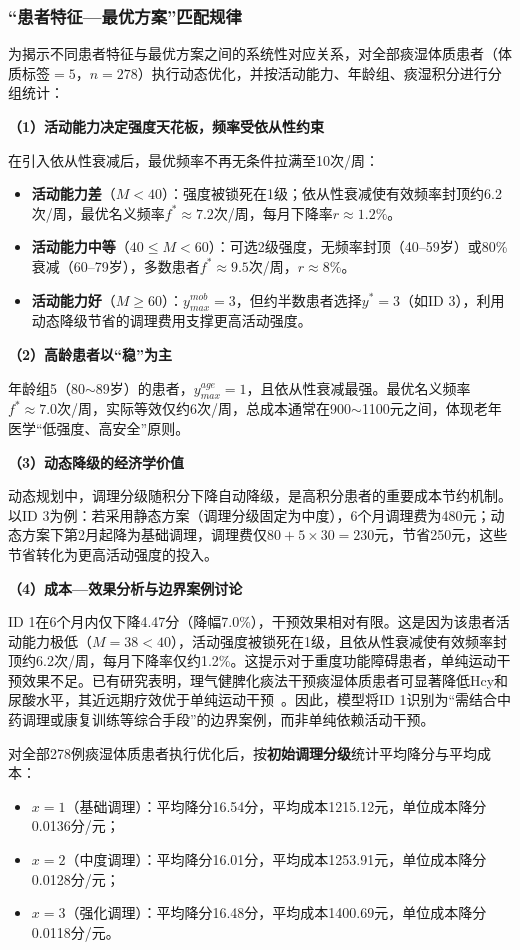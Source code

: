 \documentclass[a4paper,12pt]{ctexart}
\begin{document}
\subsubsection{``患者特征—最优方案''匹配规律}
为揭示不同患者特征与最优方案之间的系统性对应关系，对全部痰湿体质患者（体质标签$=5$，$n=278$）执行动态优化，并按活动能力、年龄组、痰湿积分进行分组统计：

\textbf{（1）活动能力决定强度天花板，频率受依从性约束}

在引入依从性衰减后，最优频率不再无条件拉满至10次/周：
\begin{itemize}
    \item \textbf{活动能力差}（$M<40$）：强度被锁死在1级；依从性衰减使有效频率封顶约6.2次/周，最优名义频率$f^*\approx7.2$次/周，每月下降率$r\approx1.2\%$。
    \item \textbf{活动能力中等}（$40\leq M<60$）：可选2级强度，无频率封顶（40--59岁）或80\%衰减（60--79岁），多数患者$f^*\approx9.5$次/周，$r\approx8\%$。
    \item \textbf{活动能力好}（$M\geq 60$）：$y_{max}^{mob}=3$，但约半数患者选择$y^*=3$（如ID 3），利用动态降级节省的调理费用支撑更高活动强度。
\end{itemize}

\textbf{（2）高龄患者以``稳''为主}

年龄组5（80$\sim$89岁）的患者，$y_{max}^{age}=1$，且依从性衰减最强。最优名义频率$f^*\approx7.0$次/周，实际等效仅约6次/周，总成本通常在900$\sim$1100元之间，体现老年医学``低强度、高安全''原则。

\textbf{（3）动态降级的经济学价值}

动态规划中，调理分级随积分下降自动降级，是高积分患者的重要成本节约机制。以ID 3为例：若采用静态方案（调理分级固定为中度），6个月调理费为480元；动态方案下第2月起降为基础调理，调理费仅$80+5\times30=230$元，节省250元，这些节省转化为更高活动强度的投入。

\textbf{（4）成本—效果分析与边界案例讨论}

ID 1在6个月内仅下降4.47分（降幅7.0\%），干预效果相对有限。这是因为该患者活动能力极低（$M=38<40$），活动强度被锁死在1级，且依从性衰减使有效频率封顶约6.2次/周，每月下降率仅约1.2\%。这提示对于重度功能障碍患者，单纯运动干预效果不足。已有研究表明，理气健脾化痰法干预痰湿体质患者可显著降低Hcy和尿酸水平，其近远期疗效优于单纯运动干预~\cite{duan2021therapy}。因此，模型将ID 1识别为``需结合中药调理或康复训练等综合手段''的边界案例，而非单纯依赖活动干预。

对全部278例痰湿体质患者执行优化后，按\textbf{初始调理分级}统计平均降分与平均成本：
\begin{itemize}
    \item $x=1$（基础调理）：平均降分16.54分，平均成本1215.12元，单位成本降分0.0136分/元；
    \item $x=2$（中度调理）：平均降分16.01分，平均成本1253.91元，单位成本降分0.0128分/元；
    \item $x=3$（强化调理）：平均降分16.48分，平均成本1400.69元，单位成本降分0.0118分/元。
\end{itemize}
\end{document}
